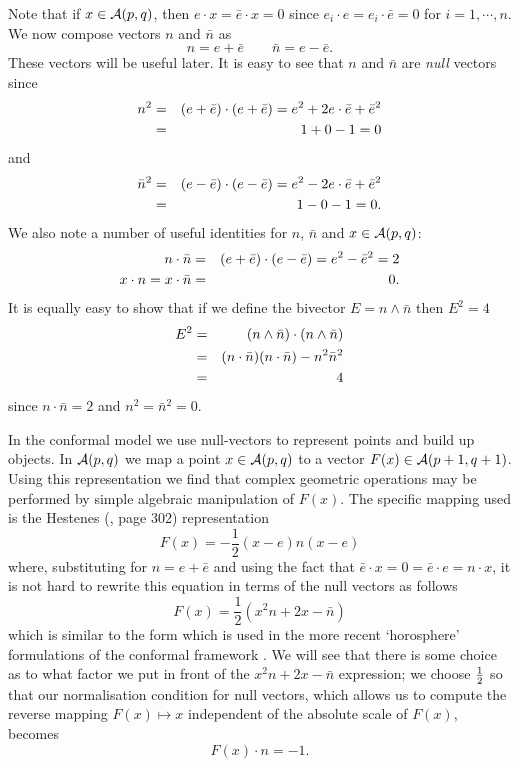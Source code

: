 Note that if $x \in {\mathcal{A}}(p,q)$, then $e\cdot x =
\bar{e}\cdot x = 0$ since $e_i\cdot e=e_i \cdot \bar{e} = 0$
for $i=1,\cdots,n$. We now compose vectors $n$ and
$\bar{n}$ as
%
\[ n = e + \bar{e}  \qquad  \bar{n} = e - \bar{e}.
\label{nequations}
\]
These vectors will be useful later. It is easy to see that
$n$ and $\bar{n}$ are \emph{null} vectors since
%
\begin{eqnarray}
n^2  & = & (e + \bar{e})\cdot(e + \bar{e}) = e^2 + 2e\cdot\bar{e} + \bar{e}^2 \nonumber \\
       & = &  1 + 0 - 1 = 0  \nonumber
\end{eqnarray}
and
\begin{eqnarray}
\bar{n}^2  & = & (e - \bar{e})\cdot(e - \bar{e}) = e^2 - 2e\cdot\bar{e} + \bar{e}^2 \nonumber \\
       & = &  1 - 0 - 1 = 0.     \nonumber
\end{eqnarray}
%
We also note a number of useful identities for $n$, $\bar{n}$ and $x \in \mathcal{A}(p,q)$:
%
\begin{eqnarray}
n\cdot\bar{n} & = & (e + \bar{e})\cdot(e - \bar{e}) = e^2 - \bar{e}^2 = 2 \nonumber \\
x\cdot n = x\cdot \bar{n} & = & 0. \nonumber 
\end{eqnarray}
%
It is equally easy to show that if we define the bivector $E = n \wedge \bar{n}$ 
then $E^2 = 4$
%
\begin{eqnarray}
  E^2 & = &  (n\wedge \bar{n})\cdot(n\wedge \bar{n}) \nonumber \\
  & = &  (n\cdot\bar{n})(n\cdot\bar{n}) - n^2 \bar{n}^2 \nonumber \\
  & = &  4
  \end{eqnarray}
since $n\cdot\bar{n}=2$ and $n^2=\bar{n}^2=0$.

In the conformal model we use null-vectors to represent points and 
build up objects.
In $\mathcal{A}(p,q)$ we map a point $x \in \mathcal{A}(p,q)$ to a vector
$F(x) \in \mathcal{A}(p+1,q+1)$. Using this representation we find that 
complex geometric operations may be performed
by simple algebraic manipulation of $F(x)$. The specific mapping
used is the Hestenes (\cite{HS84}, page 302) representation
%
\begin{equation}
F(x)=-\frac{1}{2}(x-e)n(x-e)
\end{equation}
%
where, substituting for $n=e+\bar{e}$ and using the fact that
$\bar{e}\cdot x = 0 = \bar{e}\cdot e = n\cdot x$, it is not
hard to rewrite this equation in terms of the null
vectors as follows
%
\begin{equation}
  F(x) = \frac{1}{2}(x^2n + 2x - \bar{n})
\end{equation}
%
which is similar to the form which is used in the more recent
`horosphere' formulations of the conformal framework
\cite{oldwine}. We will see that there is some choice as
to what factor we put in front of the $x^2n + 2x -
\bar{n}$ expression; we choose $\frac{1}{2}$ so that our
normalisation condition for null vectors, which allows us to
compute the reverse mapping $F(x) \mapsto x$ independent of the
absolute scale of $F(x)$, becomes
%
\[ F(x)\cdot n = -1.  \]
%


